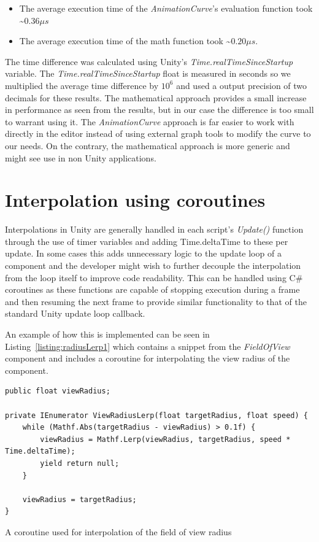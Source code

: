 \begin{itemize}
    \item The average execution time of the \emph{AnimationCurve}'s evaluation function took \textasciitilde$ 0.36 \mu s$
    \item The average execution time of the math function took \textasciitilde$ 0.20 \mu s$.
\end{itemize}

The time difference was calculated using Unity's \emph{Time.realTimeSinceStartup} variable. The \emph{Time.realTimeSinceStartup} float is measured in seconds so we multiplied the average time difference by $10^6$ and used a output precision of two decimals for these results. 
The mathematical approach provides a small increase in performance as seen from the results, but in our case the difference is too small to warrant using it. The \emph{AnimationCurve} approach is far easier to work with directly in the editor instead of using external graph tools to modify the curve to our needs. On the contrary, the mathematical approach is more generic and might see use in non Unity applications.

\section{Interpolation using coroutines}
Interpolations in Unity are generally handled in each script's \emph{Update()} function through the use of timer variables and adding Time.deltaTime to these per update. In some cases this adds unnecessary logic to the update loop of a component and the developer might wish to further decouple the interpolation from the loop itself to improve code readability. This can be handled using C\# coroutines as these functions are capable of stopping execution during a frame and then resuming the next frame to provide similar functionality to that of the standard Unity update loop callback. 

An example of how this is implemented can be seen in Listing~\ref{listing:radiusLerp1} which contains a snippet from the \emph{FieldOfView} component and includes a coroutine for interpolating the view radius of the component.

\begin{listing}[htb]
\begin{verbatim}
public float viewRadius;

private IEnumerator ViewRadiusLerp(float targetRadius, float speed) {
    while (Mathf.Abs(targetRadius - viewRadius) > 0.1f) {
        viewRadius = Mathf.Lerp(viewRadius, targetRadius, speed * Time.deltaTime);
        yield return null;
    }

    viewRadius = targetRadius;
}
\end{verbatim}
\caption[Coroutine for field of view radius interpolation]{A coroutine used for interpolation of the field of view radius}
\label{listing:radiusLerp1}
\end{listing}

